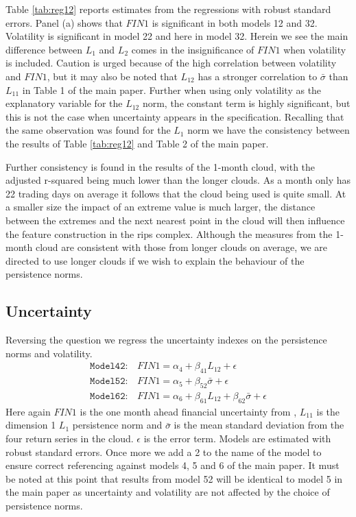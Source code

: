 \documentclass{article}
\begin{document}
Table \ref{tab:reg12} reports estimates from the regressions with \cite{newey1987simple} robust standard errors. Panel (a) shows that $FIN1$ is significant in both models 12 and 32. Volatility is significant in model 22 and here in model 32. Herein we see the main difference between $L_1$ and $L_2$ comes in the insignificance of $FIN1$ when volatility is included. Caution is urged because of the high correlation between volatility and $FIN1$, but it may also be noted that $L_{12}$ has a stronger correlation to $\bar{\sigma}$ than $L_{11}$ in Table 1 of the main paper. Further when using only volatility as the explanatory variable for the $L_{12}$ norm, the constant term is highly significant, but this is not the case when uncertainty appears in the specification. Recalling that the same observation was found for the $L_1$ norm we have the consistency between the results of Table \ref{tab:reg12} and Table 2 of the main paper.

Further consistency is found in the results of the 1-month cloud, with the adjusted r-squared being much lower than the longer clouds. As a month only has 22 trading days on average it follows that the cloud being used is quite small. At a smaller size the impact of an extreme value is much larger, the distance between the extremes and the next nearest point in the cloud will then influence the feature construction in the rips complex. Although the measures from the 1-month cloud are consistent with those from longer clouds on average, we are directed to use longer clouds if we wish to explain the behaviour of the persistence norms.

\subsection{Uncertainty}

Reversing the question we regress the uncertainty indexes on the persistence norms and volatility. 
\begin{align}
    \mathtt{Model 42:} & FIN1 = \alpha_4 + \beta_{41}L_{12} + \epsilon \\
    \mathtt{Model 52:} & FIN1 = \alpha_5 + \beta_{52}\bar{\sigma} + \epsilon\\
    \mathtt{Model 62:} & FIN1 = \alpha_6 + \beta_{61}L_{12} + \beta_{62}\bar{\sigma} + \epsilon
\end{align}
Here again $FIN1$ is the one month ahead financial uncertainty from \cite{jurado2015measuring}, $L_{11}$ is the dimension 1 $L_1$ persistence norm and $\bar{\sigma}$ is the mean standard deviation from the four return series in the cloud. $\epsilon$ is the error term. Models are estimated with \cite{newey1987simple} robust standard errors. Once more we add a 2 to the name of the model to ensure correct referencing against models 4, 5 and 6 of the main paper. It must be noted at this point that results from model 52 will be identical to model 5 in the main paper as uncertainty and volatility are not affected by the choice of persistence norms.
\end{document}
